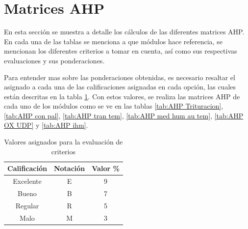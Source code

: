 \section{Matrices AHP}\label{Ap:AHPMat}
En esta sección se muestra a detalle los cálculos de las diferentes matrices AHP. En cada una de las tablas se menciona a que módulos hace referencia, se mencionan los diferentes criterios a tomar en cuenta, así como sus respectivas evaluaciones y sus ponderaciones.

Para entender mas sobre las ponderaciones obtenidas, es necesario resaltar el asignado a cada una de las calificaciones asignadas en cada opción, las cuales están descritas en la tabla \ref{tab:tabvalev}. Con estos valores, se realiza las matrices AHP de cada uno de los módulos como se ve en las tablas \ref{tab:AHP Trituracion}, \ref{tab:AHP con pal}, \ref{tab:AHP tran tem}, \ref{tab:AHP med hum au tem}, \ref{tab:AHP OX UDP} y \ref{tab:AHP ihm}.

\begin{table}[h]
    \centering
    \caption{Valores asignados para la evaluación de criterios} 
    \begin{tabular}{|c|c|c|}
    \hline
        \rowcolor[rgb]{ 0,  0,  0} \textcolor[rgb]{ 1,  1,  1}{\textbf{Calificación}} & \textcolor[rgb]{ 1,  1,  1}{\textbf{Notación}} & \textcolor[rgb]{ 1,  1,  1}{\textbf{Valor}} \% \\ \hline
        Excelente &  E & 9 \\ \hline
        Bueno & B & 7  \\ \hline
        Regular & R & 5  \\ \hline
        Malo & M & 3 \\ \hline
    \end{tabular}
    \label{tab:tabvalev}%
\end{table}


